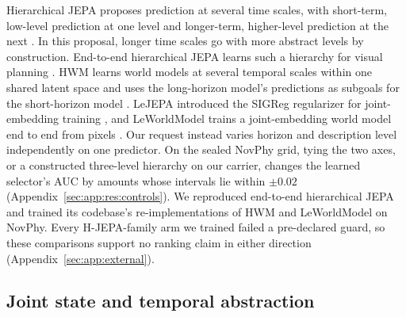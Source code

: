 \begin{revblock}
Hierarchical JEPA proposes prediction at several time scales, with short-term, low-level prediction at one level and longer-term, higher-level prediction at the next \citep[\S4.4, \S4.6]{lecun2022path}. In this proposal, longer time scales go with more abstract levels by construction. End-to-end hierarchical JEPA learns such a hierarchy for visual planning \citep{zhang2026hjepa}. HWM learns world models at several temporal scales within one shared latent space and uses the long-horizon model's predictions as subgoals for the short-horizon model \citep{zhang2026hierarchical}. LeJEPA introduced the SIGReg regularizer for joint-embedding training \citep{balestriero2025lejepa}, and LeWorldModel trains a joint-embedding world model end to end from pixels \citep{maes2026leworldmodel}. Our request instead varies horizon and description level independently on one predictor. On the sealed NovPhy grid, tying the two axes, or a constructed three-level hierarchy on our carrier, changes the learned selector's AUC by amounts whose intervals lie within $\pm0.02$ (Appendix~\ref{sec:app:res:controls}). We reproduced end-to-end hierarchical JEPA \citep{zhang2026hjepa} and trained its codebase's re-implementations of HWM and LeWorldModel on NovPhy. Every H-JEPA-family arm we trained failed a pre-declared guard, so these comparisons support no ranking claim in either direction (Appendix~\ref{sec:app:external}).
\end{revblock}

\subsection{Joint state and temporal abstraction}
\label{sec:app:rel:joint}


\subsection{\texorpdfstring{}{Evaluation platforms}}
\label{sec:app:rel:eval}


